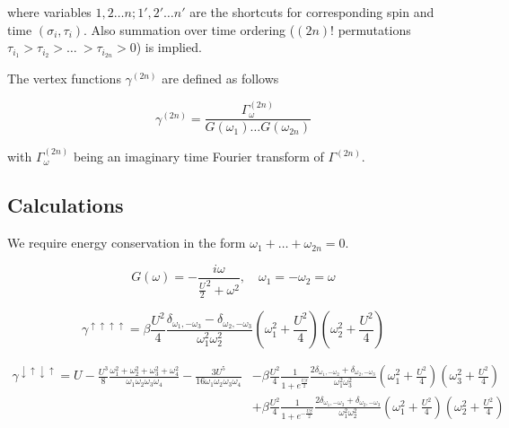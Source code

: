 where variables $1,2\dots n;1',2'\dots n'$ are the shortcuts for corresponding spin and time $(\sigma_i,\tau_i)$.
Also summation over time ordering ($(2n)!$ permutations $\tau_{i_1}>\tau_{i_2}>\dots\ >\tau_{i_{2n}}>0$) is implied.

The vertex functions $\gamma^{(2n)}$ are defined as follows

\[ \gamma^{(2n)} = \frac{\Gamma_\omega^{(2n)}}{G(\omega_1)\dots G(\omega_{2n})} \]

with $\Gamma_\omega^{(2n)}$ being an imaginary time Fourier transform of $\Gamma^{(2n)}$.

\subsection{Calculations}

We require energy conservation in the form $\omega_1+\dots+\omega_{2n}=0$.

\[ G(\omega) = -\frac{i\omega}{\frac{U}{2}^2+\omega^2},\quad \omega_1=-\omega_2=\omega\]

\[ \gamma^{\uparrow\uparrow\uparrow\uparrow} = \beta \frac{U^2}{4}\frac{\delta_{\omega_1,-\omega_3}-\delta_{\omega_2,-\omega_3}}{\omega_1^2\omega_2^2}
  (\omega_1^2+\frac{U^2}{4})(\omega_2^2+\frac{U^2}{4}) \]

\begin{align*}
 \gamma^{\downarrow\uparrow\downarrow\uparrow} = 
 U - \frac{U^3}{8}\frac{\omega_1^2+\omega_2^2+\omega_3^2+\omega_4^2}{\omega_1\omega_2\omega_3\omega_4}
   - \frac{3U^5}{16\omega_1\omega_2\omega_3\omega_4}
  &- \beta\frac{U^2}{4}\frac{1}{1+e^{\frac{U\beta}{2}}}\frac{2\delta_{\omega_1,-\omega_2}+\delta_{\omega_2,-\omega_3}}{\omega_1^2\omega_3^2}(\omega_1^2+\frac{U^2}{4})(\omega_3^2+\frac{U^2}{4}) \\
  &+ \beta\frac{U^2}{4}\frac{1}{1+e^{-\frac{U\beta}{2}}}\frac{2\delta_{\omega_1,-\omega_3}+\delta_{\omega_2,-\omega_3}}{\omega_1^2\omega_2^2}(\omega_1^2+\frac{U^2}{4})(\omega_2^2+\frac{U^2}{4})   
\end{align*}

